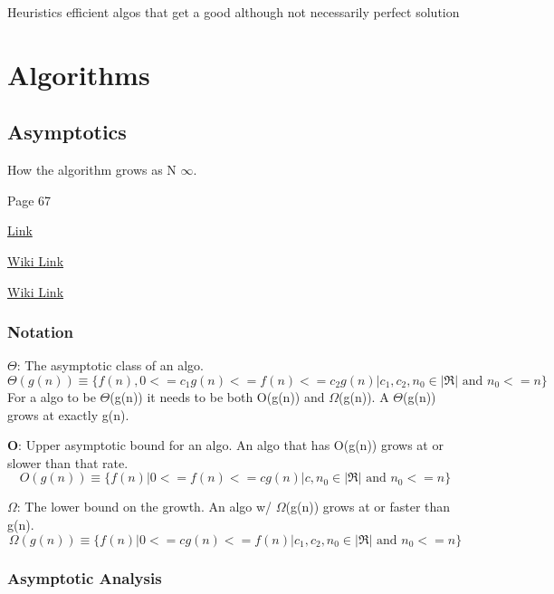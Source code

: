 Heuristics \ra efficient algos that get a good although not necessarily perfect solution
\chapter{Algorithms}
\section{Asymptotics}
How the algorithm grows as N \ra $\infty$.

 Page 67

\href{http://www.cs.umd.edu/~mount/251/Lects/251lects.pdf}{Link}

\href{https://en.wikipedia.org/wiki/Big_O_notation}{Wiki Link}

\href{https://en.wikipedia.org/wiki/Time_complexity#Constant_time}{Wiki Link}

\subsection{Notation}
	\textbf{$\Theta$}: The asymptotic class of an algo. 
	\begin{equation}
		\Theta(g(n)) \equiv \bigg\{f(n), 0<=c_1g(n)<=f(n)<=c_2g(n) | c_1, c_2, n_0 \in |\Re| \textrm{ and } n_0 <= n \bigg\}
	\end{equation}
	For a algo to be $\Theta$(g(n)) it needs to be both O(g(n)) and $\Omega$(g(n)). A $\Theta$(g(n)) grows at exactly g(n).

	\hspace{11pt}
	
	\textbf{O}: Upper asymptotic bound for an algo. An algo that has O(g(n)) grows at or slower than that rate. 
		\begin{equation}
			O(g(n)) \equiv \bigg\{f(n) | 0<= f(n) <=cg(n) | c, n_0 \in |\Re| \textrm{ and } n_0 <= n \bigg\}
		\end{equation}

	\hspace{11pt}

	\textbf{$\Omega$}: The lower bound on the growth. An algo w/ $\Omega$(g(n)) grows at or faster than g(n). 
		\begin{equation}
			\Omega(g(n)) \equiv \bigg\{f(n) | 0 <= cg(n) <= f(n) | c_1, c_2, n_0 \in |\Re| \textrm{ and } n_0 <= n \bigg\}
		\end{equation}


\subsection{Asymptotic Analysis}
